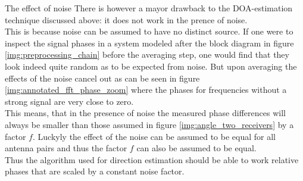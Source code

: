 \begin{subchapter}{The effect of noise}
  There is however a mayor drawback to the DOA-estimation
  technique discussed above: it does not work in the prence of noise. \\

  This is because noise can be assumed to have no distinct source.
  If one were to inspect the signal phases in a system modeled after
  the block diagram in figure \ref{img:preprocessing_chain} before
  the averaging step, one would find that they look indeed quite random
  as to be expected from noise.
  But upon averaging the effects of the noise cancel out as can be seen in figure
  \ref{img:annotated_fft_phase_zoom} where the phases for frequencies
  without a strong signal are very close to zero. \\

  This means, that in the presence of noise the measured phase differences
  will always be smaller than those assumed in figure \ref{img:angle_two_receivers}
  by a factor $f$.
  Luckyly the effect of the noise can be assumed to be equal for
  all antenna pairs and thus the factor $f$ can also be assumed to be equal. \\

  Thus the algorithm used for direction estimation
  should be able to work relative phases that are
  scaled by a constant noise factor.
\end{subchapter}

